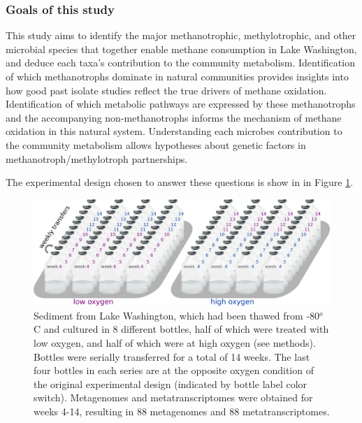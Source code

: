 \subsubsection{Goals of this study}
This study aims to identify the major methanotrophic, methylotrophic, and other microbial species that together enable methane consumption in Lake Washington, and deduce each taxa's contribution to the community metabolism.
Identification of which methanotrophs dominate in natural communities provides insights into how good past isolate studies reflect the true drivers of methane oxidation.
Identification of which metabolic pathways are expressed by these methanotrophs and the accompanying non-methanotrophs informs the mechanism of methane oxidation in this natural system.
Understanding each microbes contribution to the community metabolism allows hypotheses about genetic factors in methanotroph/methylotroph partnerships.


The experimental design chosen to answer these questions is show in in Figure \ref{fig:experimental_design}.

\begin{figure}[H]
\centering
    \includegraphics[width=1.0\textwidth]{./tex/chapter2/figures/170311_experimental_design_meta4--2_colors.png}
    \begin{singlespace}
    \caption[Experimental design.]{
       Sediment from Lake Washington, which had been thawed from -80$^o$C and cultured in 8 different bottles,
        half of which were treated with low oxygen, and half of which were at high oxygen (see methods).
	   Bottles were serially transferred for a total of 14 weeks.
	   The last four bottles in each series are at the opposite oxygen condition of the original experimental design
        (indicated by bottle label color switch).
	   Metagenomes and metatranscriptomes were obtained for weeks 4-14, resulting in 88 metagenomes and 88 metatranscriptomes.
	   }
    \label{fig:experimental_design}
    \end{singlespace}
\end{figure}

